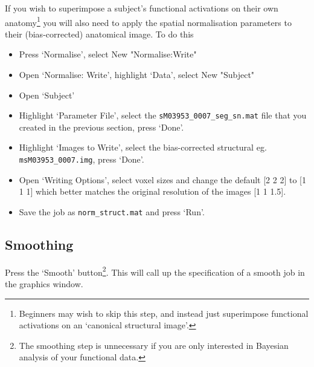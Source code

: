\documentclass[a4paper,titlepage]{book}
\newcommand{\bi}{\begin{itemize}}
\newcommand{\ei}{\end{itemize}}
\begin{document}
If you wish to superimpose a subject's functional activations on their own anatomy\footnote{Beginners may wish to skip this step, and instead just superimpose functional activations on an `canonical structural image'.} you will also need to 
apply the spatial normalisation parameters to their 
(bias-corrected) anatomical image. To do this
\bi
\item{Press `Normalise', select New "Normalise:Write"}
\item{Open `Normalise: Write', highlight `Data', select 
New "Subject"}
\item{Open `Subject'}
\item{Highlight `Parameter File', select the  \verb!sM03953_0007_seg_sn.mat! file that you 
created in the previous section, press `Done'.}
\item{Highlight `Images to Write', select the 
bias-corrected structural eg. \verb!msM03953_0007.img!, press `Done'.}
\item{Open `Writing Options', select voxel sizes and 
change the default [2 2 2] to [1 1 1] which better matches the original resolution of the images [1 1 1.5].}
\item{Save the job as \verb!norm_struct.mat! and press `Run'}.
\ei

\subsection{Smoothing}

Press the `Smooth' button\footnote{The smoothing step is unnecessary if you are only interested in Bayesian analysis of your functional data.}. This will call up the specification of a smooth job in the graphics 
window.
\end{document}
